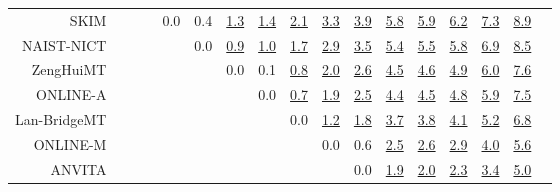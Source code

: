 \documentclass[11pt]{article}
\begin{document}
\begin{sidewaystable}
\begin{center}
{\begin{tabular}{rcccccccccccccccc}
SKIM &  &    &  & \cellcolor{red!0} 0.0 & \cellcolor{red!70} 0.4 & \cellcolor{red!70} \underline{1.3} & \cellcolor{red!70} \underline{1.4} & \cellcolor{red!70} \underline{2.1} & \cellcolor{red!70} \underline{3.3} & \cellcolor{red!70} \underline{3.9} & \cellcolor{red!70} \underline{5.8} & \cellcolor{red!70} \underline{5.9} & \cellcolor{red!70} \underline{6.2} & \cellcolor{red!70} \underline{7.3} & \cellcolor{red!70} \underline{8.9}\\ 
NAIST-NICT &  &    &  &  & \cellcolor{red!0} 0.0 & \cellcolor{red!70} \underline{0.9} & \cellcolor{red!70} \underline{1.0} & \cellcolor{red!70} \underline{1.7} & \cellcolor{red!70} \underline{2.9} & \cellcolor{red!70} \underline{3.5} & \cellcolor{red!70} \underline{5.4} & \cellcolor{red!70} \underline{5.5} & \cellcolor{red!70} \underline{5.8} & \cellcolor{red!70} \underline{6.9} & \cellcolor{red!70} \underline{8.5}\\ 
ZengHuiMT &  &    &  &  &  & \cellcolor{red!0} 0.0 & \cellcolor{red!0} 0.1 & \cellcolor{red!70} \underline{0.8} & \cellcolor{red!70} \underline{2.0} & \cellcolor{red!70} \underline{2.6} & \cellcolor{red!70} \underline{4.5} & \cellcolor{red!70} \underline{4.6} & \cellcolor{red!70} \underline{4.9} & \cellcolor{red!70} \underline{6.0} & \cellcolor{red!70} \underline{7.6}\\ 
ONLINE-A &  &    &  &  &  &  & \cellcolor{red!0} 0.0 & \cellcolor{red!70} \underline{0.7} & \cellcolor{red!70} \underline{1.9} & \cellcolor{red!70} \underline{2.5} & \cellcolor{red!70} \underline{4.4} & \cellcolor{red!70} \underline{4.5} & \cellcolor{red!70} \underline{4.8} & \cellcolor{red!70} \underline{5.9} & \cellcolor{red!70} \underline{7.5}\\ 
Lan-BridgeMT &    &  &  &  &  &  &  & \cellcolor{red!0} 0.0 & \cellcolor{red!70} \underline{1.2} & \cellcolor{red!70} \underline{1.8} & \cellcolor{red!70} \underline{3.7} & \cellcolor{red!70} \underline{3.8} & \cellcolor{red!70} \underline{4.1} & \cellcolor{red!70} \underline{5.2} & \cellcolor{red!70} \underline{6.8}\\ 
ONLINE-M &  &    &  &  &  &  &  &  & \cellcolor{red!0} 0.0 & \cellcolor{red!70} 0.6 & \cellcolor{red!70} \underline{2.5} & \cellcolor{red!70} \underline{2.6} & \cellcolor{red!70} \underline{2.9} & \cellcolor{red!70} \underline{4.0} & \cellcolor{red!70} \underline{5.6}\\ 
ANVITA &  &  &    &  &  &  &  &  &  & \cellcolor{red!0} 0.0 & \cellcolor{red!70} \underline{1.9} & \cellcolor{red!70} \underline{2.0} & \cellcolor{red!70} \underline{2.3} & \cellcolor{red!70} \underline{3.4} & \cellcolor{red!70} \underline{5.0}\\ 

\end{tabular}}
\end{center}
\end{sidewaystable}
\end{document}
